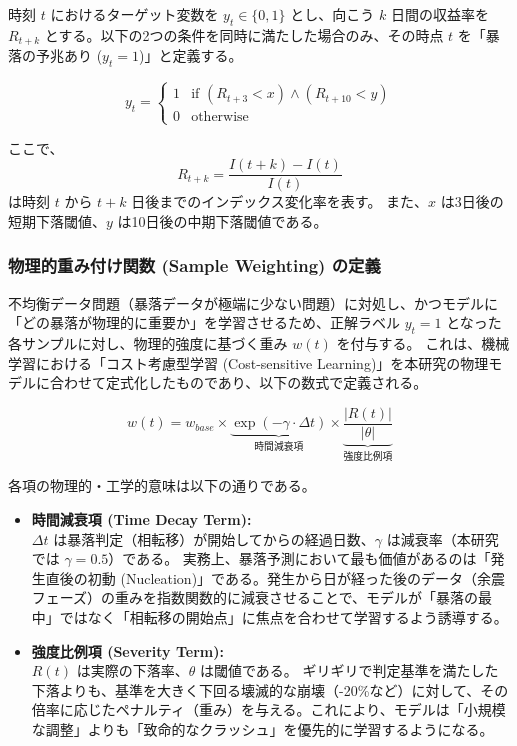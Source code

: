 \documentclass[11pt,a4paper,oneside]{ltjsarticle}
\begin{document}
時刻 $t$ におけるターゲット変数を $y_t \in \{0, 1\}$ とし、向こう $k$ 日間の収益率を $R_{t+k}$ とする。以下の2つの条件を同時に満たした場合のみ、その時点 $t$ を「暴落の予兆あり ($y_t=1$)」と定義する。

\begin{equation}
y_t = 
\begin{cases} 
1 & \text{if } (R_{t+3} < x) \land (R_{t+10} < y) \\
0 & \text{otherwise}
\end{cases}
\end{equation}

ここで、\begin{equation}
R_{t+k} = \frac{I(t+k) - I(t)}{I(t)}
\end{equation}
は時刻 $t$ から $t+k$ 日後までのインデックス変化率を表す。
また、$x$ は3日後の短期下落閾値、$y$ は10日後の中期下落閾値である。

\subsubsection{物理的重み付け関数 (Sample Weighting) の定義}
不均衡データ問題（暴落データが極端に少ない問題）に対処し、かつモデルに「どの暴落が物理的に重要か」を学習させるため、正解ラベル $y_t=1$ となった各サンプルに対し、物理的強度に基づく重み $w(t)$ を付与する。
これは、機械学習における「コスト考慮型学習 (Cost-sensitive Learning)」を本研究の物理モデルに合わせて定式化したものであり、以下の数式で定義される。

\begin{equation}
w(t) = w_{base} \times \underbrace{\exp(-\gamma \cdot \Delta t)}_{\text{時間減衰項}} \times \underbrace{\frac{|R(t)|}{|\theta|}}_{\text{強度比例項}}
\end{equation}

各項の物理的・工学的意味は以下の通りである。

\begin{itemize}
    \item \textbf{時間減衰項 (Time Decay Term):} \\
    $\Delta t$ は暴落判定（相転移）が開始してからの経過日数、$\gamma$ は減衰率（本研究では $\gamma=0.5$）である。
    実務上、暴落予測において最も価値があるのは「発生直後の初動 (Nucleation)」である。発生から日が経った後のデータ（余震フェーズ）の重みを指数関数的に減衰させることで、モデルが「暴落の最中」ではなく「相転移の開始点」に焦点を合わせて学習するよう誘導する。
    
    \item \textbf{強度比例項 (Severity Term):} \\
    $R(t)$ は実際の下落率、$\theta$ は閾値である。
    ギリギリで判定基準を満たした下落よりも、基準を大きく下回る壊滅的な崩壊（-20\%など）に対して、その倍率に応じたペナルティ（重み）を与える。これにより、モデルは「小規模な調整」よりも「致命的なクラッシュ」を優先的に学習するようになる。
\end{itemize}
\end{document}
